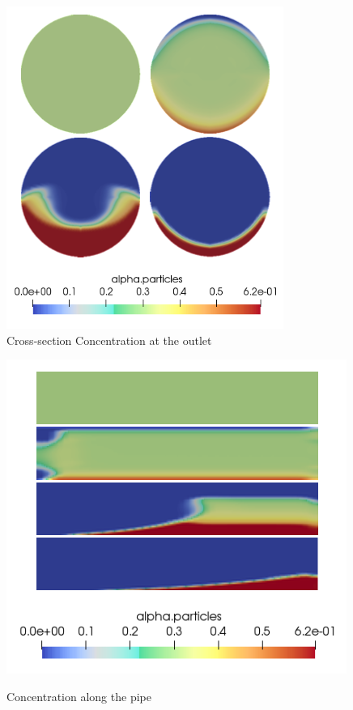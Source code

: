 \documentclass[review,3p,times,12pt]{elsarticle}
\begin{document}
\begin{minipage}{0.26\textwidth}
\begin{figure}[H]
\begin{center}
%
\includegraphics[trim=0cm 0cm 0cm 0cm,clip,scale=0.7]{figs/7.png}
\caption{ \footnotesize{Cross-section Concentration at the outlet} }
\label{fig:gauss}
\end{center}
\end{figure} 
\end{minipage}
\begin{minipage}{0.3\textwidth}
\begin{figure}[H]
\begin{center}
%
\includegraphics[trim=0cm 0cm 0cm 0cm,clip,scale=0.72]{figs/6.png}
{\caption{ \footnotesize Concentration along the pipe}}
\label{fig:gauss}
\end{center}
\end{figure} 
\end{minipage}
\end{document}
